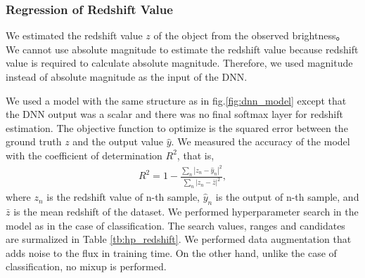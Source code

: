 \documentclass[useamsfonts]{pasj01}
\begin{document}
\subsubsection{Regression of Redshift Value}

We estimated the redshift value $z$ of the object from the observed brightness。
We cannot use absolute magnitude to estimate the redshift value because redshift value is required to calculate absolute magnitude.
Therefore, we used magnitude instead of absolute magnitude as the input of the DNN.

We used a model with the same structure as in fig.\ref{fig:dnn_model} except that the DNN output was a scalar and there was no final softmax layer for redshift estimation.
The objective function to optimize is the squared error between the ground truth $z$ and the output value $\hat{y}$.
We measured the accuracy of the model with the coefficient of determination $R^2$, that is,
\begin{eqnarray*}
    R^2 = 1 - \frac{\sum_n \left| z_n - \hat{y}_n \right|^2}{\sum_n \left| z_n - \bar{z} \right|^2}, 
\end{eqnarray*}
where $z_n$ is the redshift value of n-th sample, $\hat{y}_n$ is the output of n-th sample, and $\bar{z}$ is the mean redshift of the dataset.
We performed hyperparameter search in the model as in the case of classification.
The search values, ranges and candidates are surmalized in Table \ref{tb:hp_redshift}.
We performed data augmentation that adds noise to the flux in training time.
On the other hand, unlike the case of classification, no mixup is performed.
\end{document}
